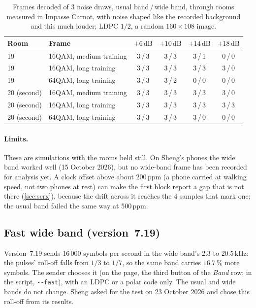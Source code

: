 \documentclass[11pt,a4paper]{article}
\newcommand{\kHz}{\,\mathrm{kHz}}
\newcommand{\dB}{\,\mathrm{dB}}
\newcommand{\code}[1]{\texttt{#1}}
\theoremstyle{remark}
\begin{document}
\begin{table}[ht]
\centering
\caption{Frames decoded of 3 noise draws, usual band\,/\,wide band, through rooms measured in Impasse Carnot, with noise shaped like the recorded background and this much louder; LDPC $1/2$, a random $160 \times 108$ image.}
\label{tab:scwide}
\small
\begin{tabular}{llcccc}
\toprule
Room & Frame & $+6\dB$ & $+10\dB$ & $+14\dB$ & $+18\dB$\\
\midrule
19 & 16QAM, medium training & 3\,/\,3 & 3\,/\,3 & 3\,/\,1 & 0\,/\,0\\
19 & 16QAM, long training & 3\,/\,3 & 3\,/\,3 & 3\,/\,3 & 3\,/\,0\\
19 & 64QAM, long training & 3\,/\,3 & 3\,/\,2 & 0\,/\,0 & 0\,/\,0\\
20 (second) & 16QAM, medium training & 3\,/\,3 & 3\,/\,3 & 3\,/\,3 & 3\,/\,0\\
20 (second) & 16QAM, long training & 3\,/\,3 & 3\,/\,3 & 3\,/\,3 & 3\,/\,3\\
20 (second) & 64QAM, long training & 3\,/\,3 & 3\,/\,3 & 3\,/\,0 & 0\,/\,0\\
\bottomrule
\end{tabular}
\end{table}

\paragraph{Limits.}
These are simulations with the rooms held still. On Sheng's phones the wide band worked well (15 October 2026), but no wide-band frame has been recorded for analysis yet. A clock offset above about 200\,ppm (a phone carried at walking speed, not two phones at rest) can make the first block report a gap that is not there (\cref{sec:scrx}), because the drift across it reaches the 4 samples that mark one; the usual band failed the same way at 500\,ppm.

\subsection{Fast wide band (version~7.19)}
\label{sec:scfast}
Version~7.19 sends 16\,000 symbols per second in the wide band's $2.3$ to $20.5\kHz$: the pulses' roll-off falls from $1/3$ to $1/7$, so the same band carries $16.7\,\%$ more symbols. The sender chooses it (on the page, the third button of the \emph{Band} row; in the script, \code{-{}-fast}), with an LDPC or a polar code only. The usual and wide bands do not change. Sheng asked for the test on 23 October 2026 and chose this roll-off from its results.
\end{document}
